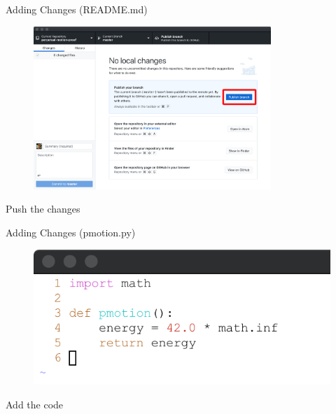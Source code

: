 \documentclass{beamer}
\begin{document}
    \begin{frame}{Adding Changes (README.md)}
        \begin{figure}
            \centering
            \includegraphics[width=0.8\textwidth]{figures/add_3.png}
        \end{figure}

        \centering
        Push the changes
    \end{frame}

    \begin{frame}{Adding Changes (pmotion.py)}
        \begin{figure}
            \centering
            \includegraphics[width=\textwidth]{figures/add_4.png}
        \end{figure}
        \centering
        Add the code
    \end{frame}
\end{document}

